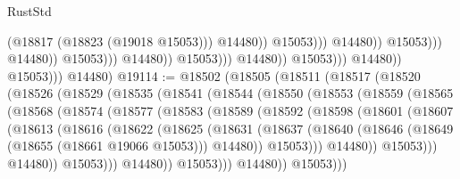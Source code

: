 \begin{lexlean}{RustStd}
\begin{coremodule}
                                                                  (@18817 (@18823 (@19018 @15053)))
                                                                  @14480))
                                                              @15053)))
                                                        @14480))
                                                    @15053)))
                                              @14480))
                                          @15053)))
                                    @14480))
                                @15053)))
                          @14480))
                      @15053)))
                @14480))
            @15053)))
      @14480)
@19114 := @18502
    (@18505
      (@18511
        (@18517
          (@18520
            (@18526
              (@18529
                (@18535
                  (@18541
                    (@18544
                      (@18550
                        (@18553
                          (@18559
                            (@18565
                              (@18568
                                (@18574
                                  (@18577
                                    (@18583
                                      (@18589
                                        (@18592
                                          (@18598
                                            (@18601
                                              (@18607
                                                (@18613
                                                  (@18616
                                                    (@18622
                                                      (@18625
                                                        (@18631
                                                          (@18637
                                                            (@18640
                                                              (@18646
                                                                (@18649
                                                                  (@18655 (@18661 @19066 @15053)))
                                                                @14480))
                                                            @15053)))
                                                      @14480))
                                                  @15053)))
                                            @14480))
                                        @15053)))
                                  @14480))
                              @15053)))
                        @14480))
                    @15053)))

\end{coremodule}
\end{lexlean}
